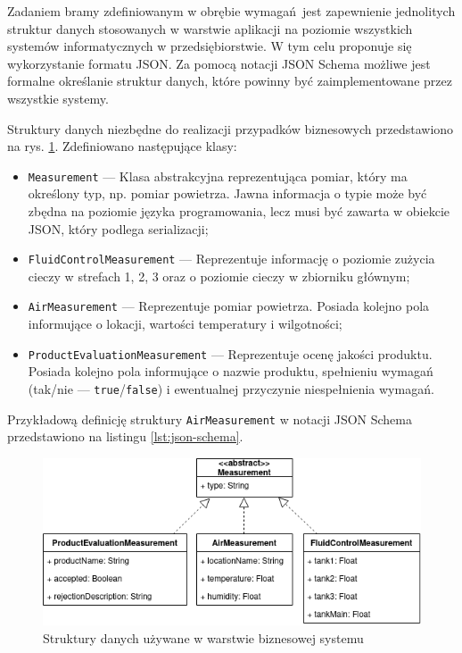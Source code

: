 \documentclass[a4paper, 12pt, twoside]{article}
\begin{document}
Zadaniem bramy zdefiniowanym w obrębie wymagań jest zapewnienie jednolitych
struktur danych stosowanych w warstwie aplikacji na poziomie wszystkich
systemów informatycznych w przedsiębiorstwie. W tym celu proponuje się
wykorzystanie formatu JSON. Za pomocą notacji JSON Schema możliwe jest
formalne określanie struktur danych, które powinny być zaimplementowane przez
wszystkie systemy.

Struktury danych niezbędne do realizacji przypadków biznesowych
przedstawiono na rys. \ref{fig:data-structs}. Zdefiniowano następujące klasy:
\begin{itemize}
      \itemsep0em
      \item \texttt{Measurement} --- Klasa abstrakcyjna reprezentująca pomiar, który ma określony typ, np. pomiar powietrza.
            Jawna informacja o typie może być zbędna na poziomie języka programowania, lecz musi być zawarta w obiekcie JSON, który podlega serializacji;
      \item \texttt{FluidControlMeasurement} --- Reprezentuje informację o poziomie zużycia cieczy w strefach 1, 2, 3 oraz o poziomie cieczy w zbiorniku głównym;
      \item \texttt{AirMeasurement} --- Reprezentuje pomiar powietrza. Posiada kolejno pola informujące o lokacji, wartości temperatury i wilgotności;
      \item \texttt{ProductEvaluationMeasurement} --- Reprezentuje ocenę jakości produktu. Posiada kolejno pola informujące o nazwie produktu,
            spełnieniu wymagań (tak/nie --- \texttt{true}/\texttt{false}) i ewentualnej przyczynie niespełnienia wymagań.
\end{itemize}
\noindent Przykładową definicję struktury \texttt{AirMeasurement} w notacji
JSON Schema przedstawiono na listingu \ref{lst:json-schema}.

\begin{figure}[h]
      \centering
      \includegraphics[scale=0.6]{data_structs.png}
      \caption{Struktury danych używane w warstwie biznesowej systemu}
      \label{fig:data-structs}
\end{figure}
\end{document}
